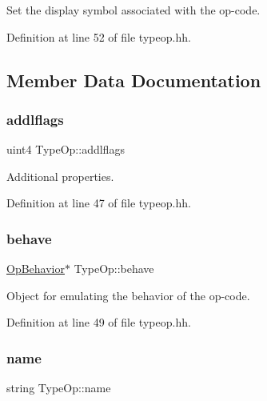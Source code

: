 Set the display symbol associated with the op-\/code. 



Definition at line 52 of file typeop.\+hh.



\subsection{Member Data Documentation}
\mbox{\label{class_type_op_a30b56e550e24236241d2a44dce290331}} 
\subsubsection{\texorpdfstring{addlflags}{addlflags}}
{\footnotesize\ttfamily uint4 Type\+Op\+::addlflags\hspace{0.3cm}{\ttfamily [protected]}}



Additional properties. 



Definition at line 47 of file typeop.\+hh.

\mbox{\label{class_type_op_acc806d7bbd5997fb998e83df32bcbbc1}} 
\subsubsection{\texorpdfstring{behave}{behave}}
{\footnotesize\ttfamily \mbox{\hyperlink{class_op_behavior}{Op\+Behavior}}$\ast$ Type\+Op\+::behave\hspace{0.3cm}{\ttfamily [protected]}}



Object for emulating the behavior of the op-\/code. 



Definition at line 49 of file typeop.\+hh.

\mbox{\label{class_type_op_a1b6f0e6b45be588062370b446d9abc4a}} 
\subsubsection{\texorpdfstring{name}{name}}
{\footnotesize\ttfamily string Type\+Op\+::name\hspace{0.3cm}{\ttfamily [protected]}}



